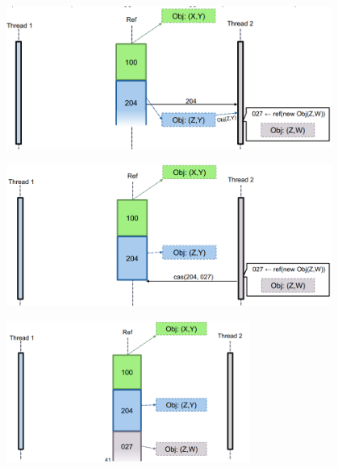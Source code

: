 \documentclass[12pt]{article}
\begin{document}
\begin{center}
    \hfill
    \includegraphics[width = 0.80\textwidth]{Images/100.PNG}
\end{center}
\begin{center}
    \hfill
    \includegraphics[width = 0.80\textwidth]{Images/101.PNG}
\end{center}
\begin{center}
    \includegraphics[width = 0.60\textwidth]{Images/102.PNG}
\end{center}
\end{document}
